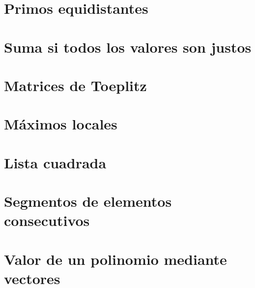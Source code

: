 \documentclass[a4paper,12pt,twoside]{book}
\begin{document}
\chapter{Primos equidistantes}

\chapter{Suma si todos los valores son justos}

\chapter{Matrices de Toeplitz}

\chapter{Máximos locales}

\chapter{Lista cuadrada}

\chapter{Segmentos de elementos consecutivos}

\chapter{Valor de un polinomio mediante vectores}
\end{document}
